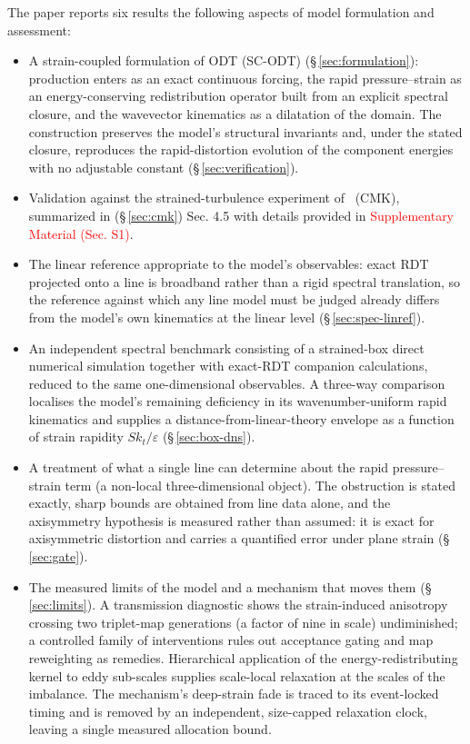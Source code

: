 \documentclass[lineno]{JFM-FLM_Au}
\begin{document}
The paper reports six results the following aspects of model formulation and assessment:
\begin{itemize}
\item A strain-coupled formulation of ODT (SC-ODT)
(\S\,\ref{sec:formulation}): production enters as an exact continuous
forcing, the rapid pressure--strain as an energy-conserving redistribution
operator built from an explicit spectral closure, and the wavevector
kinematics as a dilatation of the domain. The construction preserves the
model's structural invariants and, under the stated closure, reproduces
the rapid-distortion evolution of the component energies with no adjustable
constant (\S\,\ref{sec:verification}).

\item Validation against the strained-turbulence experiment of \citet{ChenMeneveauKatz2006}~(CMK), summarized in (\S\,\ref{sec:cmk}) Sec. 4.5 with details provided in
\textcolor{red}{Supplementary Material (Sec. S1)}.

\item The linear reference appropriate to the model's observables: exact
RDT projected onto a line is broadband rather than a rigid spectral
translation, so the reference against which any line model must be judged
already differs from the model's own kinematics at the linear level
(\S\,\ref{sec:spec-linref}).

\item An independent spectral benchmark consisting of a strained-box direct
numerical simulation together with exact-RDT companion calculations,
reduced to the same one-dimensional observables. A three-way comparison
localises the model's remaining deficiency in its wavenumber-uniform rapid
kinematics and supplies a distance-from-linear-theory envelope as a
function of strain rapidity $Sk_t/\varepsilon$ (\S\,\ref{sec:box-dns}).

\item A treatment of what a single line can determine about the rapid
pressure--strain term (a non-local three-dimensional object). The
obstruction is stated exactly, sharp bounds are obtained from line data
alone, and the axisymmetry hypothesis is measured rather than assumed: it
is exact for axisymmetric distortion and carries a quantified error under
plane strain (\S\,\ref{sec:gate}).

\item The measured limits of the model and a mechanism that moves them
(\S\,\ref{sec:limits}). A transmission diagnostic shows the strain-induced
anisotropy crossing two triplet-map generations (a factor of nine in
scale) undiminished; a controlled family of interventions rules out
acceptance gating and map reweighting as remedies. Hierarchical application
of the energy-redistributing kernel to eddy sub-scales supplies scale-local
relaxation at the scales of the imbalance. The mechanism's deep-strain fade
is traced to its event-locked timing and is removed by an independent,
size-capped relaxation clock, leaving a single measured allocation bound.


\end{itemize}
\end{document}
